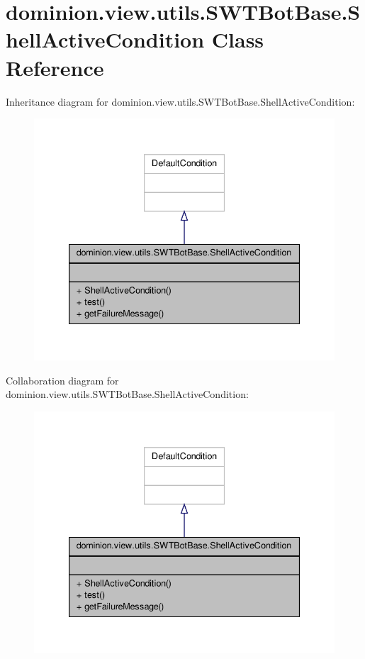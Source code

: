 \hypertarget{classdominion_1_1view_1_1utils_1_1SWTBotBase_1_1ShellActiveCondition}{\section{dominion.\-view.\-utils.\-S\-W\-T\-Bot\-Base.\-Shell\-Active\-Condition \-Class \-Reference}
\label{classdominion_1_1view_1_1utils_1_1SWTBotBase_1_1ShellActiveCondition}
}


\-Inheritance diagram for dominion.\-view.\-utils.\-S\-W\-T\-Bot\-Base.\-Shell\-Active\-Condition\-:
\nopagebreak
\begin{figure}[H]
\begin{center}
\leavevmode
\includegraphics[width=336pt]{classdominion_1_1view_1_1utils_1_1SWTBotBase_1_1ShellActiveCondition__inherit__graph}
\end{center}
\end{figure}


\-Collaboration diagram for dominion.\-view.\-utils.\-S\-W\-T\-Bot\-Base.\-Shell\-Active\-Condition\-:
\nopagebreak
\begin{figure}[H]
\begin{center}
\leavevmode
\includegraphics[width=336pt]{classdominion_1_1view_1_1utils_1_1SWTBotBase_1_1ShellActiveCondition__coll__graph}
\end{center}
\end{figure}
